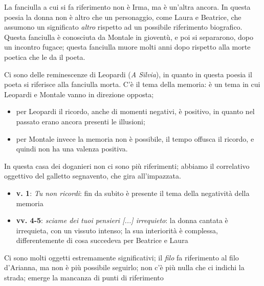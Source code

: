 \documentclass[a4paper, twoside, titlepage]{book}
\newcommand{\elenco}[1]{%
\begin{itemize}
#1
\end{itemize}}
\begin{document}
La fanciulla a cui si fa riferimento non è Irma, ma è un'altra ancora. In questa poesia la donna non è altro che un personaggio, come Laura e Beatrice, che assumono un significato \textit{altro} rispetto ad un possibile riferimento biografico. Questa fanciulla è conosciuta da Montale in gioventù, e poi si separarono, dopo un incontro fugace; questa fanciulla muore molti anni dopo rispetto alla morte poetica che le da il poeta.

Ci sono delle reminescenze di Leopardi (\textit{A Silvia}), in quanto in questa poesia il poeta si riferisce alla fanciulla morta. C'è il tema della memoria: è un tema in cui Leopardi e Montale vanno in direzione opposta;

\elenco{\item per Leopardi il ricordo, anche di momenti negativi, è positivo, in quanto nel passato erano ancora presenti le illusioni;\item per Montale invece la memoria non è possibile, il tempo offusca il ricordo, e quindi non ha una valenza positiva.}

In questa casa dei doganieri non ci sono più riferimenti; abbiamo il correlativo oggettivo del galletto segnavento, che gira all'impazzata.

\elenco{\item \textbf{v. 1}: \textit{Tu non ricordi}: fin da subito è presente il tema della negatività della memoria\item \textbf{vv. 4-5}: \textit{sciame dei tuoi pensieri [...] irrequieto}: la donna cantata è irrequieta, con un vissuto intenso; la sua interiorità è complessa, differentemente di cosa succedeva per Beatrice e Laura}

Ci sono molti oggetti estremamente significativi; il \textit{filo} fa riferimento al filo d'Arianna, ma non è più possibile seguirlo; non c'è più nulla che ci indichi la strada; emerge la mancanza di punti di riferimento
\end{document}
